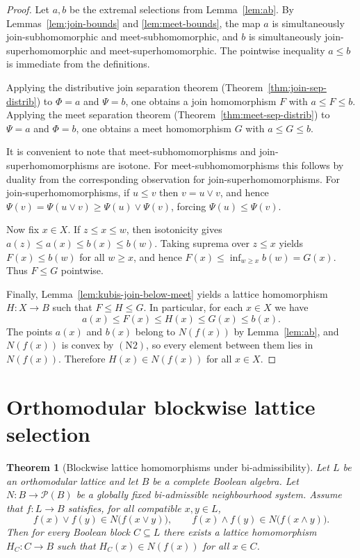 \documentclass[11pt]{amsart}
\newtheorem{theorem}{Theorem}[section]
\theoremstyle{definition}
\newcommand{\join}{\vee}
\newcommand{\meet}{\wedge}
\newcommand{\Pow}{\mathcal{P}}
\newcommand{\NTwo}{\ensuremath{\mathrm{(N2)}}}
\begin{document}
\begin{proof}
Let $a,b$ be the extremal selections from Lemma~\ref{lem:ab}.
By Lemmas~\ref{lem:join-bounds} and \ref{lem:meet-bounds}, the map $a$ is simultaneously join-subhomomorphic and meet-subhomomorphic,
and $b$ is simultaneously join-superhomomorphic and meet-superhomomorphic.
The pointwise inequality $a\le b$ is immediate from the definitions.

Applying the distributive join separation theorem (Theorem~\ref{thm:join-sep-distrib}) to $\Phi=a$ and $\Psi=b$, one obtains a join homomorphism $F$ with $a\le F\le b$.
Applying the meet separation theorem (Theorem~\ref{thm:meet-sep-distrib}) to $\Psi=a$ and $\Phi=b$, one obtains a meet homomorphism $G$ with $a\le G\le b$.

It is convenient to note that meet-subhomomorphisms and join-superhomomorphisms are isotone.
For meet-subhomomorphisms this follows by duality from the corresponding observation for join-superhomomorphisms.
For join-superhomomorphisms, if $u\le v$ then $v=u\join v$, and hence $\Psi(v)=\Psi(u\join v)\ge \Psi(u)\join\Psi(v)$, forcing $\Psi(u)\le \Psi(v)$.

Now fix $x\in X$.
If $z\le x\le w$, then isotonicity gives $a(z)\le a(x)\le b(x)\le b(w)$.
Taking suprema over $z\le x$ yields $F(x)\le b(w)$ for all $w\ge x$, and hence $F(x)\le \inf_{w\ge x} b(w)=G(x)$.
Thus $F\le G$ pointwise.

Finally, Lemma~\ref{lem:kubis-join-below-meet} yields a lattice homomorphism $H\colon X\to B$
such that $F\le H\le G$.
In particular, for each $x\in X$ we have
\[
a(x)\le F(x)\le H(x)\le G(x)\le b(x).
\]
The points $a(x)$ and $b(x)$ belong to $N(f(x))$ by Lemma~\ref{lem:ab}, and $N(f(x))$ is convex by \NTwo,
so every element between them lies in $N(f(x))$.
Therefore $H(x)\in N(f(x))$ for all $x\in X$.
\end{proof}

\section{Orthomodular blockwise lattice selection}

\begin{theorem}[Blockwise lattice homomorphisms under bi-admissibility]\label{thm:blockwise-lattice}
Let $L$ be an orthomodular lattice and let $B$ be a complete Boolean algebra.
Let $N\colon B\to\Pow(B)$ be a globally fixed bi-admissible neighbourhood system.
Assume that $f\colon L\to B$ satisfies, for all compatible $x,y\in L$,
\[
f(x)\join f(y)\in N\bigl(f(x\join y)\bigr),\qquad
f(x)\meet f(y)\in N\bigl(f(x\meet y)\bigr).
\]
Then for every Boolean block $C\subseteq L$ there exists a lattice homomorphism $H_C\colon C\to B$ such that $H_C(x)\in N(f(x))$ for all $x\in C$.
\end{theorem}
\end{document}
